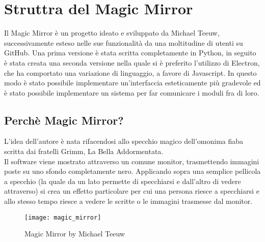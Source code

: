 \chapter{Struttra del Magic Mirror}

Il Magic Mirror è un progetto ideato e sviluppato da Michael Teeuw, successivamente esteso nelle sue funzionalità da una moltitudine di utenti su GitHub.
Una prima versione è stata scritta completamente in Python, in seguito è stata creata una seconda versione nella quale si è preferito l'utilizzo di Electron,
che ha comportato una variazione di linguaggio, a favore di Javascript. In questo modo è stato possibile implementare un'interfaccia esteticamente più gradevole
ed è stato possibile implementare un sistema per far comunicare i moduli fra di loro.
\\[2\baselineskip]
\section{Perchè Magic Mirror?}
L'idea dell'autore è nata rifacendosi allo specchio magico dell'omonima fiaba
scritta dai fratelli Grimm, La Bella Addormentata.\\
Il software viene mostrato attraverso un
comune monitor, trasmettendo immagini poste su uno sfondo completamente nero. Applicando sopra
una semplice pellicola a specchio (la quale da un lato permette di specchiarsi e dall'altro di vedere
attraverso) si crea un effetto particolare per cui una persona riesce a specchiarsi
e allo stesso tempo riesce a vedere le scritte o le immagini trasmesse dal monitor.
\\[2\baselineskip]
\begin{figure}[H]
    \texttt{[image: magic\_mirror]}
    \caption{Magic Mirror by Michael Teeuw}
\end{figure}

